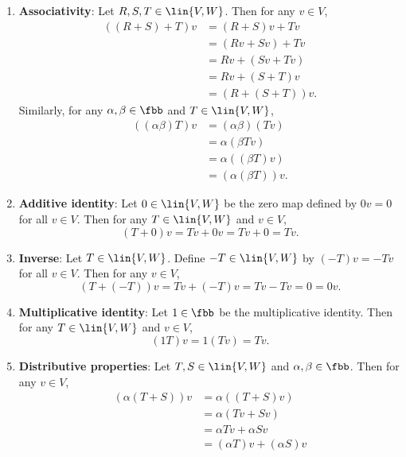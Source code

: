 \begin{sol}
\begin{enumerate}
\begin{align*}
            (S + T)v & = Sv + Tv \\
            & = Tv + Sv \\
            & = (T + S)v.
        \end{align*}
        \item \textbf{Associativity}: Let $R, S, T \in \lin{V, W}$.
	Then for any $v \in V$,
        \begin{align*}
            ((R + S) + T)v & = (R + S)v + Tv \\
            & = (Rv + Sv) + Tv \\
            & = Rv + (Sv + Tv) \\
            & = Rv + (S + T)v \\
            & = (R + (S + T))v.
        \end{align*}
        Similarly, for any $\alpha, \beta \in \fbb$ and $T \in \lin{V, W}$,
        \begin{align*}
            ((\alpha\beta)T)v & = (\alpha\beta)(Tv) \\
            & = \alpha(\beta Tv) \\
            & = \alpha((\beta T)v) \\
            & = (\alpha(\beta T))v.
        \end{align*}
        \item \textbf{Additive identity}: Let $0 \in \lin{V, W}$ be the zero map defined by $0v = 0$ for all $v \in V$.
	Then for any $T \in \lin{V, W}$ and $v \in V$,
        \[
        	(T + 0)v = Tv + 0v = Tv + 0 = Tv.
        \]
        \item \textbf{Inverse}: Let $T \in \lin{V, W}$.
	Define $-T \in \lin{V, W}$ by $(-T)v = -Tv$ for all $v \in V$.
	Then for any $v \in V$,
        \[
        	(T + (-T))v = Tv + (-T)v = Tv - Tv = 0 = 0v.
        \]
        \item \textbf{Multiplicative identity}: Let $1 \in \fbb$ be the multiplicative identity.
	Then for any $T \in \lin{V, W}$ and $v \in V$,
        \[
        	(1T)v = 1(Tv) = Tv.
        \]
        \item \textbf{Distributive properties}: Let $T, S \in \lin{V, W}$ and $\alpha, \beta \in \fbb$.
	Then for any $v \in V$,
        \begin{align*}
            (\alpha(T + S))v & = \alpha((T + S)v) \\
            & = \alpha(Tv + Sv) \\
            & = \alpha Tv + \alpha Sv \\
            & = (\alpha T)v + (\alpha S)v \\

\end{align*}
\end{enumerate}
\end{sol}
